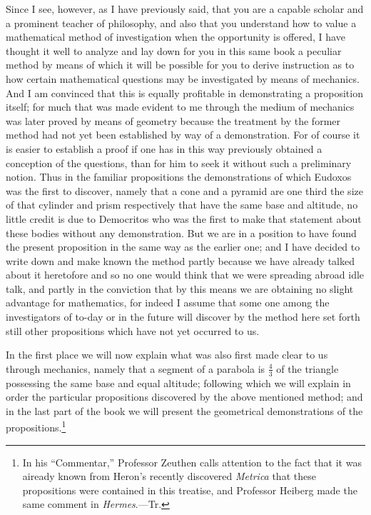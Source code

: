 \documentclass[12pt]{article}
\begin{document}
Since I see, however, as I have previously said, that you are a
capable scholar and a prominent teacher of philosophy, and also that
you understand how to value a mathematical method of investigation
when the opportunity is offered, I have thought it well to analyze and
lay down for you in this same book a peculiar method by means of which
it will be possible for you to derive instruction as to how certain
mathematical questions may be investigated by means of mechanics. And
I am convinced that this is equally profitable in demonstrating a
proposition itself; for much that was made evident to me through the
medium of mechanics was later proved by means of geometry because the
treatment by the former method had not yet been established by way of
a demonstration. For of course it is easier to establish a proof if
one has in this way previously obtained a conception of the questions,
than for him to seek it without such a preliminary notion. Thus in the
familiar propositions the demonstrations of which Eudoxos was the
first to discover, namely that a cone and a pyramid are one third the
size of that cylinder and prism respectively that have the same base
and altitude, no little credit is due to Democritos who was the first
to make that statement about these bodies without any
demonstration. But we are in a position to have found the present
proposition in the same way as the earlier one; and I have decided to
write down and make known the method partly because we have already
talked about it heretofore and so no one would think that we were
spreading abroad idle talk, and partly in the conviction that by this
means we are obtaining no slight advantage for mathematics, for indeed
I assume that some one among the investigators of to-day or in the
future will discover by the method here set forth still other
propositions which have not yet occurred to us.

In the first place we will now explain what was also first made clear
to us through mechanics, namely that a segment of a parabola is
$\frac{4}{3}$ of the triangle possessing the same base and equal
altitude; following which we will explain in order the particular
propositions discovered by the above mentioned method; and in the last
part of the book we will present the geometrical demonstrations of the
propositions.\footnote{In his ``Commentar,'' Professor Zeuthen calls
attention to the fact that it was aiready known from Heron's recently
discovered \emph{Metrica} that these propositions were contained in
this treatise, and Professor Heiberg made the same comment in
\emph{Hermes}.---Tr.}
\end{document}
